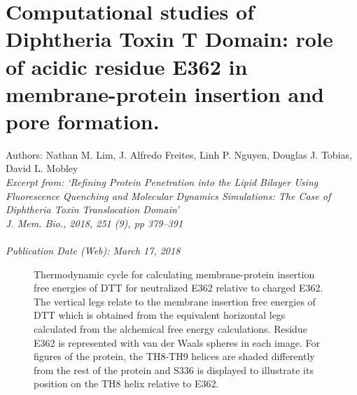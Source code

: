 \chapter{Computational studies of Diphtheria Toxin T Domain: role of acidic residue E362 in membrane-protein insertion and pore formation.}
\small{Authors: Nathan M. Lim, J. Alfredo Freites, Linh P. Nguyen, Douglas J. Tobias, David L. Mobley}\\
\emph{Excerpt from: `Refining Protein Penetration into the Lipid Bilayer Using Fluorescence Quenching and Molecular Dynamics Simulations: The Case of Diphtheria Toxin Translocation Domain' \cite{Kyrychenko2018}}\\
\emph{J. Mem. Bio., 2018, 251 (9), pp 379--391 \\
\\Publication Date (Web): March 17, 2018}


\begin{figure}[H]
\centering
{}
\caption{Thermodynamic cycle for calculating membrane-protein insertion free energies of DTT for neutralized E362 relative to charged E362. The vertical legs relate to the membrane insertion free energies of DTT which is obtained from the equivalent horizontal legs calculated from the alchemical free energy calculations. Residue E362 is represented with van der Waals spheres in each image. For figures of the protein, the TH8-TH9 helices are shaded differently from the rest of the protein and S336 is displayed to illustrate its position on the TH8 helix relative to E362.}
\label{fig:dtt_thermo_cycle}
\end{figure}



